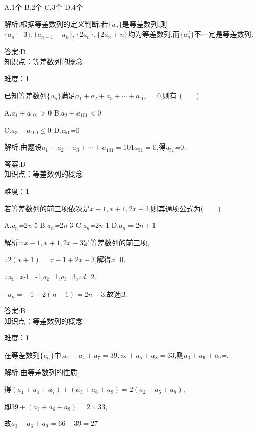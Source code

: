 \documentclass{article} %
\begin{document}
 A.1个 B.2个 C.3个 D.4个

 解析:根据等差数列的定义判断,若$\mathrm{\{}$\textit{a${}_{n}$}$\mathrm{\}}$是等差数列,则$\{a_n+3\},\{a_{n+1}-a_n\},\{2a_n\},\{2a_n+n\}$均为等差数列,而$\{a_n^2\}$不一定是等差数列\textit{.}

 答案:D \\

知识点：等差数列的概念

难度：1

 已知等差数列$\mathrm{\{}$\textit{a${}_{n}$}$\mathrm{\}}$满足$a_1+a_2+a_3+\cdots+a_{101} = 0$,则有 (\textit{　　})

 A.$a_1 + a_{101} > 0$ B.$a_2 + a_{101} < 0$

 C.$a_3 +a_{100} \le 0$ D.\textit{a}${}_{51}$\textit{=}0

 解析:由题设$a_1+a_2+a_3+\cdots+a_{101} = 101a_{51} = 0$,得\textit{a}${}_{51}$\textit{=}0\textit{.}

 答案:D \\

知识点：等差数列的概念

难度：1

 若等差数列的前三项依次是$x-1, x+1, 2x+3$,则其通项公式为(\textit{　　})

 A.\textit{a${}_{n}$=}2\textit{n-}5 B.\textit{a${}_{n}$=}2\textit{n-}3 C.\textit{a${}_{n}$=}2\textit{n-}1 D.$a_n = 2n+1$

 解析:$\because x-1, x+1, 2x+3$是等差数列的前三项,

$\therefore 2(x+1)=x-1+2x+3$,解得\textit{x=}0\textit{.}

\textit{$\therefore$a}${}_{1}$\textit{=x-}1\textit{=-}1,\textit{a}${}_{2}$\textit{=}1,\textit{a}${}_{3}$\textit{=}3,\textit{$\therefore$d=}2\textit{.}

$\therefore a_n = -1+2(n-1) = 2n-3$,故选B\textit{.}

 答案:B \\

知识点：等差数列的概念

难度：1

 在等差数列$\mathrm{\{}$\textit{a${}_{n}$}$\mathrm{\}}$中,$a_1+a_4+a_7=39,a_2+a_5+a_8=33$,则$a_3+a_6+a_9$\textit{=\underbar{　　　　}.~}

 解析:由等差数列的性质,

得$(a_1+a_4+a_7)+(a_3+a_6+a_9) = 2(a_2+a_5+a_8)$,

即$39+(a_3+a_6+a_9) = 2\times 33$,

故$a_3+a_6+a_9 = 66-39 = 27$
\end{document}
